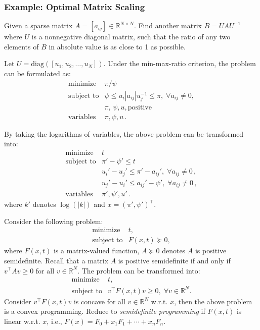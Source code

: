 \documentclass[final,leqno]{siamltex}
\begin{document}
\hypertarget{sec:example-optimal-matrix-scaling}{%
\subsubsection{Example: Optimal Matrix Scaling}\label{sec:example-optimal-matrix-scaling}}

Given a sparse matrix \(A = [a_{ij}] \in \mathbb{R}^{N\times N}\).
Find another matrix \(B = U A U^{-1}\) where \(U\) is a nonnegative diagonal matrix, such that the ratio of any two elements of \(B\) in absolute value is as close to 1 as possible.

Let \(U = \mathrm{diag}([u_1, u_2, \ldots, u_N])\). Under the min-max-ratio criterion, the problem can be formulated as:
\[\begin{array}{ll}
    \text{minimize}   &  \pi/\psi  \\
    \text{subject to} &  \psi \leq u_i |a_{ij}| u_j^{-1} \leq \pi, \; 
                                            \forall a_{ij} \neq 0 , \\
                      &  \pi, \, \psi, u, \text{positive} \\
    \text{variables}  &  \pi, \psi, u \, .
  \end{array}
\]

By taking the logarithms of variables, the above problem can be transformed
into:
\[\begin{array}{ll}
    \text{minimize}   &  t \\
    \text{subject to} &  \pi' - \psi' \leq t \\
                      &  u_i' - u_j'  \leq \pi' - a_{ij}', \; \forall a_{ij} \neq 0 \,, \\
                      &  u_j' - u_i' \leq a_{ij}' - \psi', \; \forall a_{ij} \neq 0 \,, \\
    \text{variables}  &  \pi', \psi', u' \, .
  \end{array}
\]
where \(k'\) denotes \(\log( | k | )\) and \(x = (\pi', \psi' )^\top\).

Consider the following problem:
\[\begin{array}{ll}
    \text{minimize}    & t, \\
    \text{subject to}  & F(x, t) \succeq 0,
  \end{array}
\]
where \(F(x, t)\) is a matrix-valued function, \(A \succeq 0\) denotes \(A\) is positive semidefinite. Recall that a matrix \(A\) is positive semidefinite if and only if \(v^\top A v \ge 0\) for all \(v \in \mathbb{R}^N\). The problem can be transformed into:
\[\begin{array}{ll}
        \text{minimize}      & t, \\
        \text{subject to}    & v^\top F(x, t) v \ge 0, \; \forall v \in \mathbb{R}^N.
  \end{array}
\]
Consider \(v^\top F(x, t) v\) is concave for all \(v \in \mathbb{R}^N\) w.r.t. \(x\), then the above problem is a convex programming. Reduce to \emph{semidefinite programming} if \(F(x, t)\) is linear w.r.t. \(x\), i.e., \(F(x) = F_0 + x_1 F_1 + \cdots + x_n F_n\).
\end{document}
